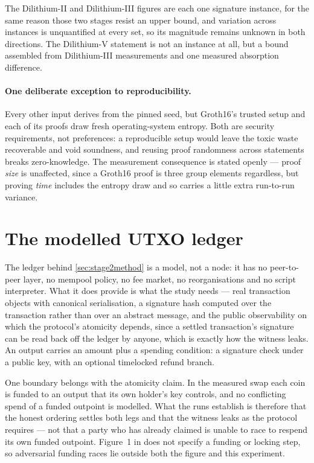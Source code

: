 The Dilithium-II and Dilithium-III figures are each one signature instance, for the same
reason those two stages resist an upper bound, and variation across instances is
unquantified at every set, so its magnitude remains unknown in both directions. The Dilithium-V statement is not an instance at all, but a
bound assembled from Dilithium-III measurements and one measured absorption difference.

\paragraph{One deliberate exception to reproducibility.}
Every other input derives from the pinned seed, but Groth16's trusted setup and each
of its proofs draw fresh operating-system entropy. Both are security requirements, not preferences: a reproducible setup would leave the toxic waste recoverable
and void soundness, and reusing proof randomness across statements breaks
zero-knowledge. The measurement consequence is stated openly --- proof
\emph{size} is unaffected, since a Groth16 proof is three group elements regardless,
but proving \emph{time} includes the entropy draw and so carries a little extra
run-to-run variance.

\section{The modelled UTXO ledger}
\label{app:utxomodel}

The ledger behind \cref{sec:stage2method} is a model, not a node: it has no
peer-to-peer layer, no mempool policy, no fee market, no reorganisations and no script
interpreter. What it does provide is what the study needs --- real transaction objects
with canonical serialisation, a signature hash computed over the transaction rather
than over an abstract message, and the public observability on which the protocol's
atomicity depends, since a settled transaction's signature can be read back off the
ledger by anyone, which is exactly how the witness leaks. An output carries an amount
plus a spending condition: a signature check under a public key, with an optional
timelocked refund branch.

One boundary belongs with the atomicity claim. In the measured swap each coin is funded
to an output that its own holder's key controls, and no conflicting spend of a funded
outpoint is modelled. What the runs establish is therefore that the honest ordering
settles both legs and that the witness leaks as the protocol requires --- not that a
party who has already claimed is unable to race to respend its own funded outpoint.
Figure~1 in \cite{esgin2020post} does not specify a funding or locking step, so
adversarial funding races lie outside both the figure and this experiment.

